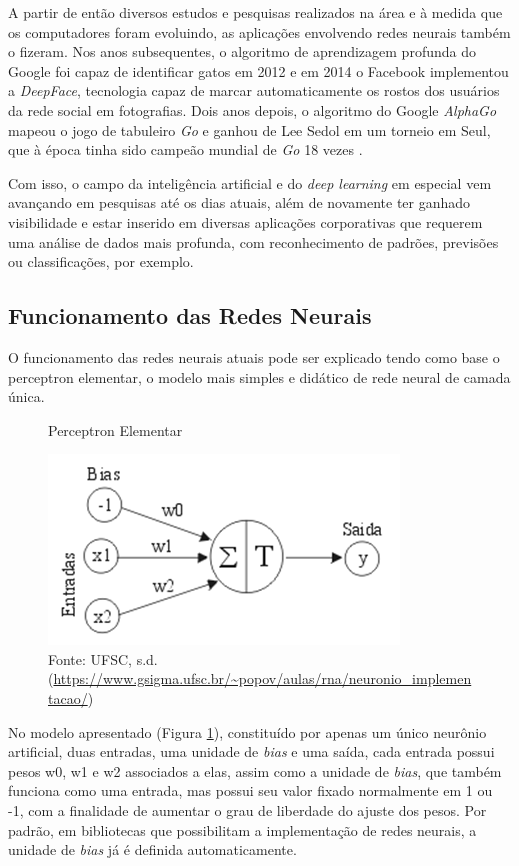 \par A partir de então diversos estudos e pesquisas realizados na área e à medida que os computadores foram evoluindo, as aplicações envolvendo redes neurais também o fizeram. Nos anos subsequentes, o algoritmo de aprendizagem profunda do Google foi capaz de identificar gatos em 2012 e em 2014 o Facebook implementou a \textit{DeepFace}, tecnologia capaz de marcar automaticamente os rostos dos usuários da rede social em fotografias. Dois anos depois, o algoritmo do Google \textit{AlphaGo} mapeou o jogo de tabuleiro \textit{Go} e ganhou de Lee Sedol em um torneio em Seul, que à época tinha sido campeão mundial de \textit{Go} 18 vezes \cite{Academy2019}.

\par Com isso, o campo da inteligência artificial e do \textit{deep learning} em especial vem avançando em pesquisas até os dias atuais, além de novamente ter ganhado visibilidade e estar inserido em diversas aplicações corporativas que requerem uma análise de dados mais profunda, com reconhecimento de padrões, previsões ou classificações, por exemplo.

\subsection{Funcionamento das Redes Neurais}

\indent
\par O funcionamento das redes neurais atuais pode ser explicado tendo como base o perceptron elementar, o modelo mais simples e didático de rede neural de camada única.

\begin{figure}[H]
    \centering
    \caption{Perceptron Elementar}
    \includegraphics[width=0.6\linewidth]{Imagens/perceptron.png}
    \caption*{Fonte: UFSC, s.d. (\url{https://www.gsigma.ufsc.br/~popov/aulas/rna/neuronio_implementacao/})}
    \label{perceptron}
\end{figure}

\par No modelo apresentado (Figura \ref{perceptron}), constituído por apenas um único neurônio artificial, duas entradas, uma unidade de \textit{bias} e uma saída, cada entrada possui pesos w0, w1 e w2 associados a elas, assim como a unidade de \textit{bias}, que também funciona como uma entrada, mas possui seu valor fixado normalmente em 1 ou -1, com a finalidade de aumentar o grau de liberdade do ajuste dos pesos. Por padrão, em bibliotecas que possibilitam a implementação de redes neurais, a unidade de \textit{bias} já é definida automaticamente.

